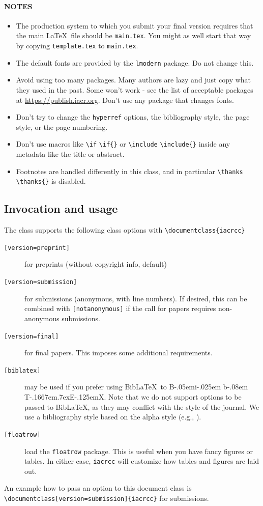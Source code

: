 \documentclass{iacrcc}
\newcommand{\cmd}[2][]{%
  \def\FirstArg{#1}
  \ifx\FirstArg\empty
    \texttt{\textbackslash{}#2}%
  \else
    \texttt{\textbackslash{}#2\{#1\}}%
  \fi
}
\def\BibTeX{{\rm B\kern-.05em{\sc i\kern-.025em b}\kern-.08em
    T\kern-.1667em\lower.7ex\hbox{E}\kern-.125emX}}
\def\BibLaTeX{Bib\LaTeX}
\begin{document}
\paragraph*{NOTES}
\begin{itemize}
\item The production system to which you submit your final version requires
  that the main \LaTeX\ file should be \texttt{main.tex}. You might as
  well start that way by copying \texttt{template.tex} to \texttt{main.tex}.
\item The default fonts are provided by the \verb+lmodern+ package. Do not
  change this.
\item Avoid using too many packages. Many authors are lazy and just
  copy what they used in the past. Some won't work - see the list of
  acceptable packages at \url{https://publish.iacr.org}. Don't use any
  package that changes fonts.
\item Don't try to change the \texttt{hyperref} options, the bibliography style,
  the page style, or the page numbering.
\item Don't use macros like \cmd{if} or \cmd{include} inside any
  metadata like the title or abstract.
\item Footnotes are handled differently in this class, and in
  particular \cmd{thanks} is disabled.
\end{itemize}

\subsection{Invocation and usage}

The class supports the following class options with \verb+\documentclass{iacrcc}+
\begin{description}
\item[\texttt{[version=preprint]}] for preprints (without copyright info, default)
\item[\texttt{[version=submission]}] for submissions (anonymous, with
  line numbers).  If desired, this can be combined with
  \texttt{[notanonymous]} if the call for papers requires
  non-anonymous submissions.
\item[\texttt{[version=final]}] for final papers. This imposes some
  additional requirements.
\item[\texttt{[biblatex]}] may be used if you prefer using
  \BibLaTeX\ to \BibTeX. Note that we do not support options to be
  passed to \BibLaTeX, as they may conflict with the style of the journal. We use
  a bibliography style based on the alpha style (e.g., \cite{RSA78}).
\item[\texttt{[floatrow]}] load the \texttt{floatrow} package. This is useful
  when you have fancy figures or tables. In either case, \texttt{iacrcc}
  will customize how tables and figures are laid out.
\end{description}
An example how to pass an option to this document class is
\sloppy\verb+\documentclass[version=submission]{iacrcc}+
for submissions.
\end{document}
